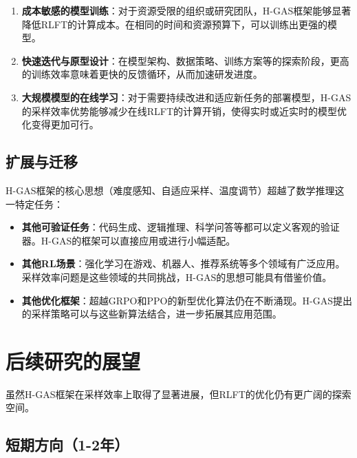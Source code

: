 \begin{enumerate}
    \item \textbf{成本敏感的模型训练}：对于资源受限的组织或研究团队，H-GAS框架能够显著降低RLFT的计算成本。在相同的时间和资源预算下，可以训练出更强的模型。
    
    \item \textbf{快速迭代与原型设计}：在模型架构、数据策略、训练方案等的探索阶段，更高的训练效率意味着更快的反馈循环，从而加速研发进度。
    
    \item \textbf{大规模模型的在线学习}：对于需要持续改进和适应新任务的部署模型，H-GAS的采样效率优势能够减少在线RLFT的计算开销，使得实时或近实时的模型优化变得更加可行。
\end{enumerate}

\subsection{扩展与迁移}
\label{subsec:extension_migration}

H-GAS框架的核心思想（难度感知、自适应采样、温度调节）超越了数学推理这一特定任务：

\begin{itemize}
    \item \textbf{其他可验证任务}：代码生成、逻辑推理、科学问答等都可以定义客观的验证器。H-GAS的框架可以直接应用或进行小幅适配。
    
    \item \textbf{其他RL场景}：强化学习在游戏、机器人、推荐系统等多个领域有广泛应用。采样效率问题是这些领域的共同挑战，H-GAS的思想可能具有借鉴价值。
    
    \item \textbf{其他优化框架}：超越GRPO和PPO的新型优化算法仍在不断涌现。H-GAS提出的采样策略可以与这些新算法结合，进一步拓展其应用范围。
\end{itemize}

\section{后续研究的展望}
\label{sec:future_outlook}

虽然H-GAS框架在采样效率上取得了显著进展，但RLFT的优化仍有更广阔的探索空间。

\subsection{短期方向（1-2年）}
\label{subsec:short_term}

